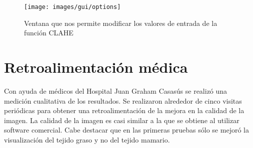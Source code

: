 \begin{figure}[h]
  \begin{center}
    {\texttt{[image: images/gui/options]}}
  \end{center}
  \caption[GUI: Modificación de parámetros]
  {Ventana que nos permite modificar los valores de entrada de la función CLAHE}
  \label{options}
\end{figure}

\section{Retroalimentación médica}

Con ayuda de médicos del Hospital Juan Graham Casasús se realizó una medición
cualitativa de los resultados. Se realizaron alrededor de cinco visitas
periódicas para obtener una retroalimentación de la mejora en la calidad de la
imagen. La calidad de la imagen es casi similar a la que se obtiene al utilizar
software comercial. Cabe destacar que en las primeras pruebas sólo se mejoró la
visualización del tejido graso y no del tejido mamario.
